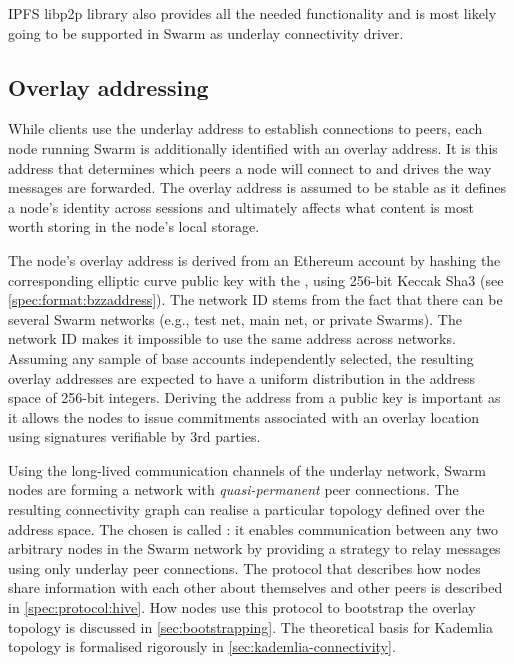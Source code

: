 IPFS libp2p library also provides all the needed functionality and is most likely going to be supported in Swarm as underlay connectivity driver.

\subsection{Overlay addressing}\label{sec:overlay-addressing} 


While clients use the underlay address to establish connections to peers, each node running Swarm is additionally identified with an overlay address. It is this address that determines which peers a node will connect to and drives the way messages are forwarded. The overlay address is assumed to be stable as it defines a node's identity across sessions and ultimately affects what content is most worth storing in the node's local storage.

The node's overlay address is derived from an Ethereum account by hashing the corresponding elliptic curve public key with the , using 256-bit Keccak Sha3 (see \ref{spec:format:bzzaddress}). The network ID stems from the fact that there can be several Swarm networks (e.g., test net, main net, or private Swarms). The network ID makes it impossible to use the same address across networks. Assuming any sample of base accounts independently selected, the resulting overlay addresses are expected to have a uniform distribution in the address space of 256-bit integers. Deriving the address from a public key is important as it allows the nodes to issue commitments associated with an overlay location using signatures verifiable by 3rd parties. 

Using the long-lived communication channels of the underlay network, Swarm nodes are forming a network with \emph{quasi-permanent} peer connections. The resulting connectivity graph can realise a particular topology defined over the address space. The  chosen is called : it enables communication between any two arbitrary nodes in the Swarm network by providing a strategy to relay messages using only underlay peer connections. The protocol that describes how nodes share information with each other about themselves and other peers is described in \ref{spec:protocol:hive}. How nodes use this protocol to bootstrap the overlay topology is discussed in \ref{sec:bootstrapping}. The  theoretical basis for Kademlia topology is formalised rigorously in \ref{sec:kademlia-connectivity}. 


